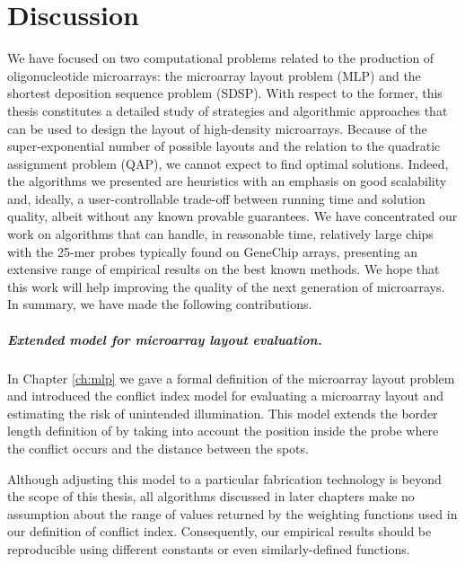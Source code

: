 \chapter{Discussion}
\label{ch:discuss}

We have focused on two computational problems related to the production of
oligonucleotide microarrays: the microarray layout problem (MLP) and the
shortest deposition sequence problem (SDSP). With respect to the former, this
thesis constitutes a detailed study of strategies and algorithmic approaches
that can be used to design the layout of high-density microarrays. Because of
the super-exponential number of possible layouts and the relation to the
quadratic assignment problem (QAP), we cannot expect to find optimal solutions.
Indeed, the algorithms we presented are heuristics with an emphasis on good
scalability and, ideally, a user-controllable trade-off between running time and
solution quality, albeit without any known provable guarantees. We have
concentrated our work on algorithms that can handle, in reasonable time,
relatively large chips with the 25-mer probes typically found on GeneChip
arrays, presenting an extensive range of empirical results on the best known
methods. We hope that this work will help improving the quality of the next
generation of microarrays. In summary, we have made the following contributions.

\paragraph{Extended model for microarray layout evaluation.} In Chapter
\ref{ch:mlp} we gave a formal definition of the microarray layout problem and
introduced the conflict index model for evaluating a microarray layout and
estimating the risk of unintended illumination. This model extends the border
length definition of \citet{Hannenhalli2002} by taking into account the position
inside the probe where the conflict occurs and the distance between the spots.

Although adjusting this model to a particular fabrication technology is beyond
the scope of this thesis, all algorithms discussed in later chapters make no
assumption about the range of values returned by the weighting functions used in
our definition of conflict index. Consequently, our empirical results should be
reproducible using different constants or even similarly-defined functions.

